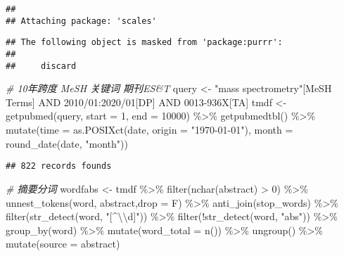 \documentclass[]{tufte-book}
\newenvironment{Shaded}{}{}
\newcommand{\AttributeTok}[1]{\textcolor[rgb]{0.49,0.56,0.16}{#1}}
\newcommand{\CommentTok}[1]{\textcolor[rgb]{0.38,0.63,0.69}{\textit{#1}}}
\newcommand{\DecValTok}[1]{\textcolor[rgb]{0.25,0.63,0.44}{#1}}
\newcommand{\FunctionTok}[1]{\textcolor[rgb]{0.02,0.16,0.49}{#1}}
\newcommand{\NormalTok}[1]{#1}
\newcommand{\OtherTok}[1]{\textcolor[rgb]{0.00,0.44,0.13}{#1}}
\newcommand{\SpecialCharTok}[1]{\textcolor[rgb]{0.25,0.44,0.63}{#1}}
\newcommand{\StringTok}[1]{\textcolor[rgb]{0.25,0.44,0.63}{#1}}
\begin{document}
\begin{verbatim}
## 
## Attaching package: 'scales'
\end{verbatim}

\begin{verbatim}
## The following object is masked from 'package:purrr':
## 
##     discard
\end{verbatim}

\begin{Shaded}
\begin{Highlighting}[]
\CommentTok{\# 10年跨度 MeSH 关键词 期刊ES\&T}
\NormalTok{query }\OtherTok{\textless{}{-}} \StringTok{\textquotesingle{}"mass spectrometry"[MeSH Terms] AND 2010/01:2020/01[DP] AND 0013{-}936X[TA]\textquotesingle{}}
\NormalTok{tmdf }\OtherTok{\textless{}{-}} \FunctionTok{getpubmed}\NormalTok{(query, }\AttributeTok{start =} \DecValTok{1}\NormalTok{, }\AttributeTok{end =} \DecValTok{10000}\NormalTok{) }\SpecialCharTok{\%\textgreater{}\%}
        \FunctionTok{getpubmedtbl}\NormalTok{() }\SpecialCharTok{\%\textgreater{}\%}
        \FunctionTok{mutate}\NormalTok{(}\AttributeTok{time =} \FunctionTok{as.POSIXct}\NormalTok{(date, }\AttributeTok{origin =} \StringTok{"1970{-}01{-}01"}\NormalTok{),}
         \AttributeTok{month =} \FunctionTok{round\_date}\NormalTok{(date, }\StringTok{"month"}\NormalTok{))}
\end{Highlighting}
\end{Shaded}

\begin{verbatim}
## 822 records founds
\end{verbatim}

\begin{Shaded}
\begin{Highlighting}[]
\CommentTok{\# 摘要分词}
\NormalTok{wordfabs }\OtherTok{\textless{}{-}}\NormalTok{ tmdf }\SpecialCharTok{\%\textgreater{}\%}
        \FunctionTok{filter}\NormalTok{(}\FunctionTok{nchar}\NormalTok{(abstract) }\SpecialCharTok{\textgreater{}} \DecValTok{0}\NormalTok{) }\SpecialCharTok{\%\textgreater{}\%}
        \FunctionTok{unnest\_tokens}\NormalTok{(word, abstract,}\AttributeTok{drop =}\NormalTok{ F) }\SpecialCharTok{\%\textgreater{}\%}
        \FunctionTok{anti\_join}\NormalTok{(stop\_words) }\SpecialCharTok{\%\textgreater{}\%}
        \FunctionTok{filter}\NormalTok{(}\FunctionTok{str\_detect}\NormalTok{(word, }\StringTok{"[\^{}}\SpecialCharTok{\textbackslash{}\textbackslash{}}\StringTok{d]"}\NormalTok{)) }\SpecialCharTok{\%\textgreater{}\%}
        \FunctionTok{filter}\NormalTok{(}\SpecialCharTok{!}\FunctionTok{str\_detect}\NormalTok{(word, }\StringTok{"abs"}\NormalTok{)) }\SpecialCharTok{\%\textgreater{}\%}
        \FunctionTok{group\_by}\NormalTok{(word) }\SpecialCharTok{\%\textgreater{}\%}
        \FunctionTok{mutate}\NormalTok{(}\AttributeTok{word\_total =} \FunctionTok{n}\NormalTok{()) }\SpecialCharTok{\%\textgreater{}\%}
        \FunctionTok{ungroup}\NormalTok{() }\SpecialCharTok{\%\textgreater{}\%}
        \FunctionTok{mutate}\NormalTok{(}\AttributeTok{source =} \StringTok{\textquotesingle{}abstract\textquotesingle{}}\NormalTok{)}
\end{Highlighting}
\end{Shaded}
\end{document}
